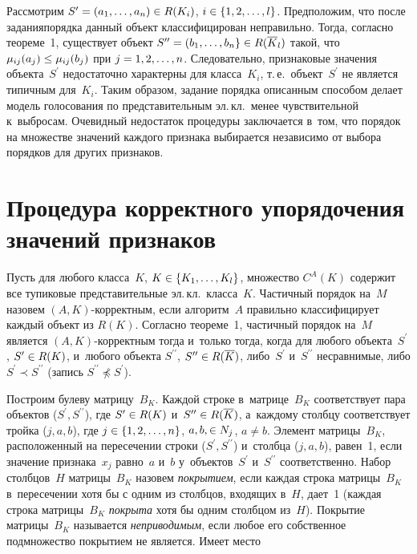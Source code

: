 \begin{multicols}{2}
  Рассмотрим $S^\prime\hm= (a_1,\ldots , a_n)\hm\in R(K_i)$, $i\hm\in 
\{1,2,\ldots , l\}$. Предположим, что после задания\linebreak порядка данный объект 
классифицирован неправильно. Тогда, согласно теореме~1, существует объект 
$S^{\prime\prime}\hm= (b_1, \ldots , b_n\}\hm\in R(\overline{K}_l)$ такой, что 
$\mu_{ij}(a_j)\hm\leq \mu_{ij}(b_j)$ при $j\hm= 1,2,\ldots , n$. Следовательно,\linebreak 
признаковые значения объекта~$S^\prime$ недостаточно характерны для 
класса~$K_i$, т.\,е.\ объект~$S^\prime$ не является типичным для~$K_i$. 
Таким образом, задание порядка описанным способом делает модель 
голосования по представительным эл.\,кл.\ менее чувствительной к~выбросам. 
Очевидный недостаток процедуры заключается в~том, что порядок на 
множестве значений каждого признака выбирается независимо от выбора 
порядков для других признаков.

\section{Процедура корректного упорядочения значений 
признаков}

\vspace*{-6pt}

  Пусть для любого класса~$K$, $K\hm\in \{K_1, \ldots , K_l\}$, множество 
$C^A(K)$ содержит все тупиковые представительные эл.\,кл.\ класса~$K$. 
Частичный порядок на~$M$ назовем $(A,K)$-кор\-рект\-ным, если 
алгоритм~$A$ правильно классифицирует каждый объект из $R(K)$. Согласно 
тео\-ре\-ме~1, частичный порядок на~$M$ является $(A,K)$-кор\-рект\-ным 
тогда и~только тогда, когда для любого объекта~$S^\prime$, $S^\prime\hm\in 
R(K)$, и~любого объекта $S^{\prime\prime}$, $S^{\prime\prime}\hm\in 
R(\overline{K})$, либо~$S^\prime$ и~$S^{\prime\prime}$ несравнимые, либо 
$S^\prime \prec S^{\prime\prime}$ (запись $S^{\prime\prime}\not\preceq 
S^\prime$). 
  
  Построим булеву матрицу~$B_K$. Каждой строке в~матрице~$B_K$ 
соответствует пара объектов ($S^\prime, S^{\prime\prime}$), где $S^\prime\hm 
\in R(K)$ и~$S^{\prime\prime}\hm\in R(\overline{K})$, а~каждому столб\-цу 
соответствует тройка ($j,a,b$), где $j\hm\in \{1,2,\ldots , n\}$, $a,b,\hm\in N_j$, 
$a\not= b$. Элемент матрицы~$B_K$, расположенный на пересечении строки 
($S^\prime, S^{\prime\prime}$) и~столбца ($j,a,b$), равен~1, если значение 
признака~$x_j$ равно~$a$ и~$b$ у~объектов~$S^\prime$ и~$S^{\prime\prime}$ 
соответственно. Набор столбцов~$H$ матрицы~$B_K$ назовем 
\textit{покрытием}, если каждая строка матрицы~$B_K$ в~пересечении хотя бы 
с одним из столбцов, входящих в~$H$, дает~1 (каж\-дая строка мат\-ри\-цы~$B_K$ 
\textit{покрыта} хотя бы одним столбцом из~$H$). Покрытие мат\-ри\-цы~$B_K$ 
называется \textit{неприводимым}, если любое его собственное подмножество 
покрытием не является. Имеет \mbox{место}
  

\end{multicols}
